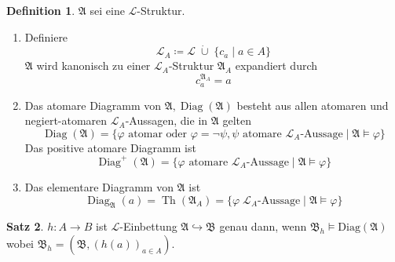 \documentclass[12pt,parskip=full]{scrartcl}
\theoremstyle{definition}
\newtheorem{theorem}{Satz}[section]
\newtheorem{definition}[theorem]{Definition}
\begin{document}
	\begin{definition}
		$\mathfrak{A}$ sei eine $\mathcal{L}$-Struktur.
		\begin{enumerate}
			\item Definiere
			\begin{equation*}
				\mathcal{L}_A \coloneqq \mathcal{L} \;\dot{\cup}\; \{ c_a \mid a \in A \}
			\end{equation*}
			$\mathfrak{A}$ wird kanonisch zu einer $\mathcal{L}_A$-Struktur $\mathfrak{A}_A$ expandiert durch
			\begin{equation*}
				c_a^{\mathfrak{A}_A} = a
			\end{equation*}
			\item Das atomare Diagramm von $\mathfrak{A}, \operatorname{Diag}(\mathfrak{A})$ besteht aus allen atomaren und negiert-atomaren $\mathcal{L}_A$-Aussagen, die in $\mathfrak{A}$ gelten
			\begin{equation*}
				\operatorname{Diag}(\mathfrak{A}) = \{ \text{$\varphi$ atomar oder $\varphi = \lnot \psi, \psi$ atomare $\mathcal{L}_A$-Aussage} \mid \mathfrak{A} \models \varphi \}
			\end{equation*}
			Das positive atomare Diagramm ist
			\begin{equation*}
				\operatorname{Diag}^+(\mathfrak{A}) = \{ \text{$\varphi$ atomare $\mathcal{L}_A$-Aussage} \mid \mathfrak{A} \models \varphi \}
			\end{equation*}
			\item Das elementare Diagramm von $\mathfrak{A}$ ist
			\begin{equation*}
				\operatorname{Diag}_\mathfrak{A}(a) = \operatorname{Th}(\mathfrak{A}_A) = \{ \varphi \; \mathcal{L}_A\text{-Aussage} \mid \mathfrak{A} \models \varphi \}
			\end{equation*}
		\end{enumerate}
	\end{definition}

	\begin{theorem}
		$h: A \to B$ ist $\mathcal{L}$-Einbettung $\mathfrak{A} \hookrightarrow \mathfrak{B}$ genau dann, wenn $\mathfrak{B}_h \models \operatorname{Diag(\mathfrak{A})}$ wobei $\mathfrak{B}_h = \left(\mathfrak{B}, (h(a))_{a \in A} \right)$.
	\end{theorem}
\end{document}
